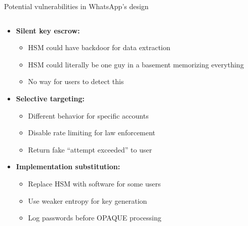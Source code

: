 \documentclass[aspectratio=169, lualatex, handout]{beamer}
\begin{document}
\begin{frame}{Potential vulnerabilities in WhatsApp's design}
	\begin{columns}[c]
		\begin{column}{1\textwidth}
			\begin{itemize}
				\item \textbf{Silent key escrow:}
				      \begin{itemize}
					      \item HSM could have backdoor for data extraction
					      \item HSM could literally be one guy in a basement memorizing everything
					      \item No way for users to detect this
				      \end{itemize}
				\item \textbf{Selective targeting:}
				      \begin{itemize}
					      \item Different behavior for specific accounts
					      \item Disable rate limiting for law enforcement
					      \item Return fake ``attempt exceeded'' to user
				      \end{itemize}
				\item \textbf{Implementation substitution:}
				      \begin{itemize}
					      \item Replace HSM with software for some users
					      \item Use weaker entropy for key generation
					      \item Log passwords before OPAQUE processing
				      \end{itemize}
			\end{itemize}
		\end{column}
	\end{columns}
\end{frame}
\end{document}
